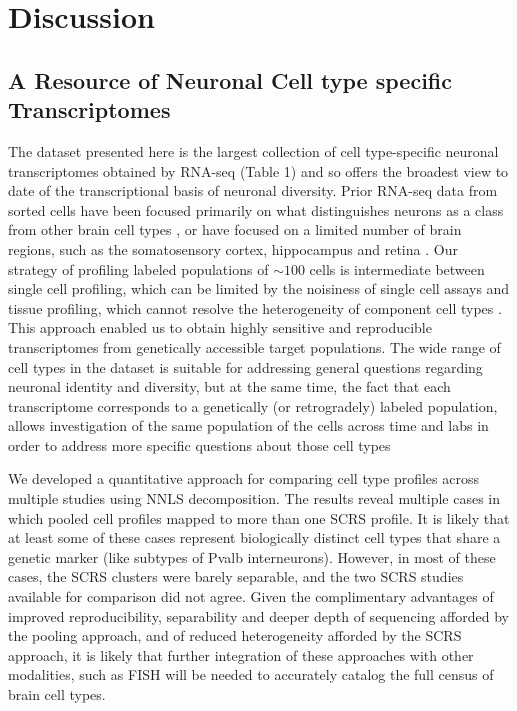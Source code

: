 
\section{Discussion}

\subsection{A Resource of Neuronal Cell type specific Transcriptomes}
The dataset presented here is the largest collection of cell type-specific neuronal transcriptomes obtained by RNA-seq (Table 1) and so offers the broadest view to date of the transcriptional basis of neuronal diversity. Prior RNA-seq data from sorted cells have been focused primarily on what distinguishes neurons as a class from other brain cell types \citep{Zhang_2014}, or have focused on a limited number of brain regions, such as the somatosensory cortex, hippocampus  \citep{Zeisel_2015,Cembrowski_2016,Tasic_2016} and retina \citep{Macosko_2015}. Our strategy of profiling labeled populations of $\sim100$ cells is intermediate between single cell profiling, which can be limited by the noisiness of single cell assays \citep{Marinov_2013} and tissue profiling, which cannot resolve the heterogeneity of component cell types \citep{Nelson_2006}. This approach enabled us to obtain highly sensitive and reproducible transcriptomes from genetically accessible target populations. The wide range of cell types in the dataset is suitable for addressing general questions regarding neuronal identity and diversity, but at the same time, the fact that each transcriptome corresponds to a genetically (or retrogradely) labeled population, allows investigation of the same population of the cells across time and labs in order to address more specific questions about those cell types

We developed a quantitative approach for comparing cell type profiles across multiple studies using NNLS decomposition. The results reveal multiple cases in which pooled cell profiles mapped to more than one SCRS profile. It is likely that at least some of these cases represent biologically distinct cell types that share a genetic marker (like subtypes of Pvalb interneurons). However, in most of these cases, the SCRS clusters were barely separable, and the two SCRS studies available for comparison did not agree. Given the complimentary advantages of improved reproducibility, separability and deeper depth of sequencing afforded by the pooling approach, and of reduced heterogeneity afforded by the SCRS approach, it is likely that further integration of these approaches with other modalities, such as FISH \citep{Moffitt_2016} will be needed to accurately catalog the full census of brain cell types. 

